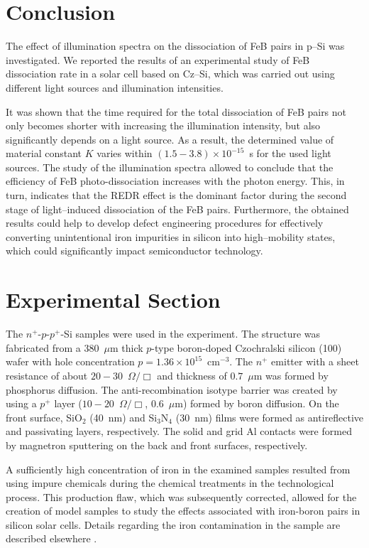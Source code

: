 \documentclass{WileyMSP-template}
\begin{document}
\section{Conclusion}\label{SecConsl}

The effect of illumination spectra on the dissociation of
FeB pairs in p--Si was investigated.
We reported the results of an experimental study of FeB dissociation rate in a solar cell based on Cz--Si,
which was carried out using different light sources and illumination intensities.


It was shown that the time required for the total dissociation of FeB pairs
not only becomes shorter with increasing the illumination intensity, but also significantly depends
on a light source.
As a result, the determined value of material constant $K$  varies within
$(1.5-3.8)\times10^{-15}$~s
for the used light sources.
The study of the illumination spectra allowed to conclude that the efficiency of FeB photo-dissociation increases with the photon energy.
This, in turn, indicates that
the REDR effect is the dominant factor during the second stage of light--induced dissociation of the FeB pairs.
Furthermore, the obtained results could help to develop defect engineering procedures
for effectively converting unintentional iron impurities in silicon into high--mobility states,
which could significantly impact semiconductor technology.


\section{Experimental Section}
\label{SecExp}

The $n^+$-$p$-$p^+$-Si samples were used in the experiment.
The structure was fabricated from a 380~$\mu$m thick $p$-type boron-doped
Czochralski silicon (100) wafer with hole concentration $p=1.36\times10^{15}$~cm$^{-3}$.
The $n^+$ emitter with a sheet resistance of about $20-30$~$\Omega/\Box$
and  thickness of $0.7$~$\mu$m was formed by phosphorus diffusion.
The anti-recombination isotype barrier was created by using a $p^+$
layer ($10-20$~$\Omega/\Box$, $0.6$~$\mu$m) formed by boron diffusion.
On the front surface, SiO$_2$ (40~nm) and Si$_3$N$_4$ (30~nm) films were formed as antireflective and passivating layers, respectively.
The solid and grid Al contacts were formed by magnetron sputtering on the back and front surfaces, respectively.

A sufficiently high concentration of iron in the examined samples resulted from using impure chemicals during the chemical treatments in the technological process.
This production flaw, which was subsequently corrected, allowed for the creation of model samples to study the effects associated with iron-boron pairs in silicon solar cells.
Details regarding the iron contamination in the sample are described elsewhere \cite{Olikh2021JAP}.
\end{document}
